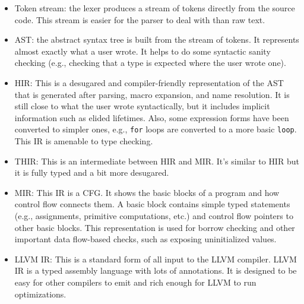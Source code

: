 \documentclass[paper=a4,%
  twoside,%
  BCOR4mm,%
  abstract=true,%
  toc=bibliography,%
  chapterprefix=true,%
  toc=bibliographynumbered,%
  open=right,%
  english,%
  pagesize=pdftex]{scrreprt}
\newcommand{\hir}{\ac{HIR}\xspace}
\newcommand{\mir}{\ac{MIR}\xspace}
\newcommand{\cfg}{\ac{CFG}\xspace}
\begin{document}
\begin{itemize}
    \item Token stream: the lexer produces a stream of tokens directly from the source code. This stream is easier for the parser to deal with than raw text.
    \item \ac{AST}: the abstract syntax tree is built from the stream of tokens. It represents almost exactly what a user wrote. It helps to do some syntactic sanity checking (e.g., checking that a type is expected where the user wrote one).
    \item \hir: This is a desugared and compiler-friendly representation of the \ac{AST} that is generated after parsing, macro expansion, and name resolution. It is still close to what the user wrote syntactically, but it includes implicit information such as elided lifetimes. Also, some expression forms have been converted to simpler ones, e.g., \texttt{for} loops are converted to a more basic \texttt{loop}. This \ac{IR} is amenable to type checking.
    \item \ac{THIR}: This is an intermediate between \hir and \mir. It's similar to \hir but it is fully typed and a bit more desugared.
    \item \mir: This \ac{IR} is a \cfg. It shows the basic blocks of a program and how control flow connects them. A basic block contains simple typed statements (e.g., assignments, primitive computations, etc.) and control flow pointers to other basic blocks. This representation is used for borrow checking and other important data flow-based checks, such as exposing uninitialized values.
    \item LLVM \ac{IR}: This is a standard form of all input to the LLVM compiler. LLVM \ac{IR} is a typed assembly language with lots of annotations. It is designed to be easy for other compilers to emit and rich enough for LLVM to run optimizations.
\end{itemize}
\end{document}
